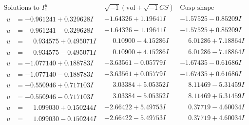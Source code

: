\documentclass[1p]{elsarticle_modified}
\theoremstyle{definition}
\newcommand{\I}{\sqrt{-1}}
\begin{document}
$$\begin{array}{c|c|c}  
\text{Solutions to }I^u_{1}& \I (\text{vol} + \sqrt{-1}CS) & \text{Cusp shape}\\
 \hline 
\begin{aligned}
u &= -0.961241 + 0.329628 I\end{aligned}
 & -1.64326 + 1.19641 I & -1.57525 - 0.85209 I \\ \hline\begin{aligned}
u &= -0.961241 - 0.329628 I\end{aligned}
 & -1.64326 - 1.19641 I & -1.57525 + 0.85209 I \\ \hline\begin{aligned}
u &= \phantom{-}0.934575 + 0.495071 I\end{aligned}
 & \phantom{-}0.10900 - 4.15286 I & \phantom{-}6.01286 + 7.18864 I \\ \hline\begin{aligned}
u &= \phantom{-}0.934575 - 0.495071 I\end{aligned}
 & \phantom{-}0.10900 + 4.15286 I & \phantom{-}6.01286 - 7.18864 I \\ \hline\begin{aligned}
u &= -1.077140 + 0.188783 I\end{aligned}
 & -3.63561 - 0.05779 I & -1.67435 - 0.61686 I \\ \hline\begin{aligned}
u &= -1.077140 - 0.188783 I\end{aligned}
 & -3.63561 + 0.05779 I & -1.67435 + 0.61686 I \\ \hline\begin{aligned}
u &= -0.550946 + 0.717103 I\end{aligned}
 & \phantom{-}3.03384 + 5.05352 I & \phantom{-}8.11469 - 5.31459 I \\ \hline\begin{aligned}
u &= -0.550946 - 0.717103 I\end{aligned}
 & \phantom{-}3.03384 - 5.05352 I & \phantom{-}8.11469 + 5.31459 I \\ \hline\begin{aligned}
u &= \phantom{-}1.099030 + 0.150244 I\end{aligned}
 & -2.66422 + 5.49753 I & \phantom{-}0.37719 - 4.60034 I \\ \hline\begin{aligned}
u &= \phantom{-}1.099030 - 0.150244 I\end{aligned}
 & -2.66422 - 5.49753 I & \phantom{-}0.37719 + 4.60034 I \\ \hline\begin{aligned}

\end{aligned}
\end{array}$$
\end{document}
